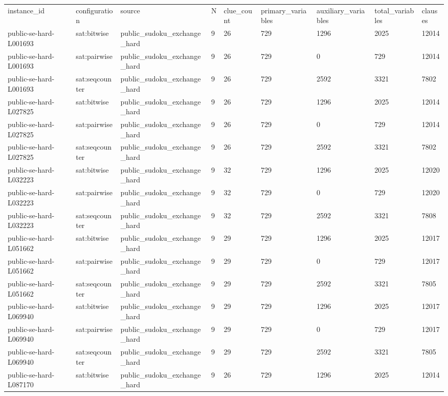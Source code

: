 \begin{tabular}{lllllllll}
\hline
instance\_id & configuration & source & N & clue\_count & primary\_variables & auxiliary\_variables & total\_variables & clauses \\
public-se-hard-L001693 & sat:bitwise & public\_sudoku\_exchange\_hard & 9 & 26 & 729 & 1296 & 2025 & 12014 \\
public-se-hard-L001693 & sat:pairwise & public\_sudoku\_exchange\_hard & 9 & 26 & 729 & 0 & 729 & 12014 \\
public-se-hard-L001693 & sat:seqcounter & public\_sudoku\_exchange\_hard & 9 & 26 & 729 & 2592 & 3321 & 7802 \\
public-se-hard-L027825 & sat:bitwise & public\_sudoku\_exchange\_hard & 9 & 26 & 729 & 1296 & 2025 & 12014 \\
public-se-hard-L027825 & sat:pairwise & public\_sudoku\_exchange\_hard & 9 & 26 & 729 & 0 & 729 & 12014 \\
public-se-hard-L027825 & sat:seqcounter & public\_sudoku\_exchange\_hard & 9 & 26 & 729 & 2592 & 3321 & 7802 \\
public-se-hard-L032223 & sat:bitwise & public\_sudoku\_exchange\_hard & 9 & 32 & 729 & 1296 & 2025 & 12020 \\
public-se-hard-L032223 & sat:pairwise & public\_sudoku\_exchange\_hard & 9 & 32 & 729 & 0 & 729 & 12020 \\
public-se-hard-L032223 & sat:seqcounter & public\_sudoku\_exchange\_hard & 9 & 32 & 729 & 2592 & 3321 & 7808 \\
public-se-hard-L051662 & sat:bitwise & public\_sudoku\_exchange\_hard & 9 & 29 & 729 & 1296 & 2025 & 12017 \\
public-se-hard-L051662 & sat:pairwise & public\_sudoku\_exchange\_hard & 9 & 29 & 729 & 0 & 729 & 12017 \\
public-se-hard-L051662 & sat:seqcounter & public\_sudoku\_exchange\_hard & 9 & 29 & 729 & 2592 & 3321 & 7805 \\
public-se-hard-L069940 & sat:bitwise & public\_sudoku\_exchange\_hard & 9 & 29 & 729 & 1296 & 2025 & 12017 \\
public-se-hard-L069940 & sat:pairwise & public\_sudoku\_exchange\_hard & 9 & 29 & 729 & 0 & 729 & 12017 \\
public-se-hard-L069940 & sat:seqcounter & public\_sudoku\_exchange\_hard & 9 & 29 & 729 & 2592 & 3321 & 7805 \\
public-se-hard-L087170 & sat:bitwise & public\_sudoku\_exchange\_hard & 9 & 26 & 729 & 1296 & 2025 & 12014 \\

\end{tabular}
